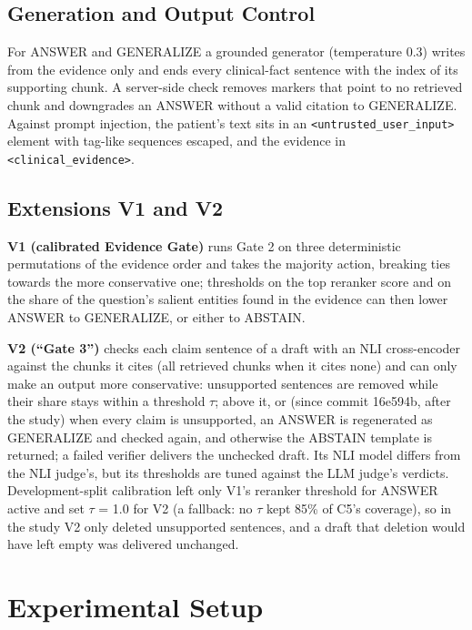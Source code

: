 \documentclass[conference]{IEEEtran}
\begin{document}
\subsection{Generation and Output Control}

For ANSWER and GENERALIZE a grounded generator (temperature 0.3) writes from the evidence only and ends every clinical-fact sentence with the index of its supporting chunk. A server-side check removes markers that point to no retrieved chunk and downgrades an ANSWER without a valid citation to GENERALIZE. Against prompt injection, the patient's text sits in an \texttt{\textless{}untrusted\_\allowbreak{}user\_\allowbreak{}input\textgreater{}} element with tag-like sequences escaped, and the evidence in \texttt{\textless{}clinical\_\allowbreak{}evidence\textgreater{}}.

\subsection{Extensions V1 and V2}

\textbf{V1 (calibrated Evidence Gate)} runs Gate 2 on three deterministic permutations of the evidence order and takes the majority action, breaking ties towards the more conservative one; thresholds on the top reranker score and on the share of the question's salient entities found in the evidence can then lower ANSWER to GENERALIZE, or either to ABSTAIN.

\textbf{V2 (``Gate 3'')} checks each claim sentence of a draft with an NLI cross-encoder against the chunks it cites (all retrieved chunks when it cites none) and can only make an output more conservative: unsupported sentences are removed while their share stays within a threshold $\tau$; above it, or (since commit 16e594b, after the study) when every claim is unsupported, an ANSWER is regenerated as GENERALIZE and checked again, and otherwise the ABSTAIN template is returned; a failed verifier delivers the unchecked draft. Its NLI model differs from the NLI judge's, but its thresholds are tuned against the LLM judge's verdicts. Development-split calibration left only V1's reranker threshold for ANSWER active and set $\tau$ = 1.0 for V2 (a fallback: no $\tau$ kept 85\% of C5's coverage), so in the study V2 only deleted unsupported sentences, and a draft that deletion would have left empty was delivered unchanged.

\section{Experimental Setup}\label{sec:setup}
\end{document}
